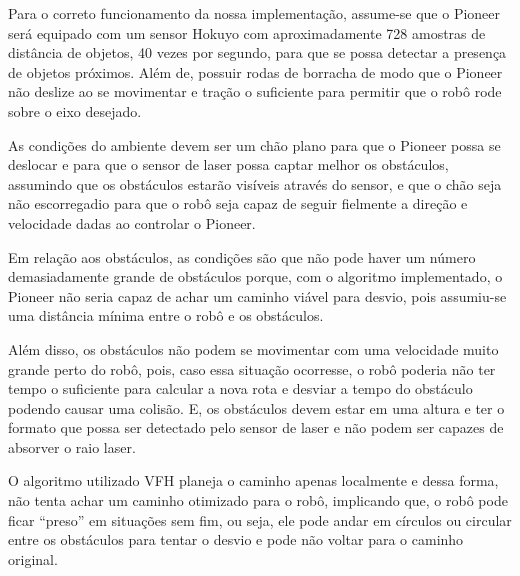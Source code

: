 Para o correto funcionamento da nossa implementação, assume-se que o Pioneer será equipado com um sensor Hokuyo com aproximadamente 728 amostras de distância de objetos, 40 vezes por segundo, para que se possa detectar a presença de objetos próximos. Além de, possuir rodas de borracha de modo que o Pioneer não deslize ao se movimentar e tração o suficiente para permitir que o robô rode sobre o eixo desejado.

As condições do ambiente devem ser um chão plano para que o Pioneer possa se deslocar e para que o sensor de laser possa captar melhor os obstáculos, assumindo que os obstáculos estarão visíveis através do sensor, e que o chão seja não escorregadio para que o robô seja capaz de seguir fielmente a direção e velocidade dadas ao controlar o Pioneer.

Em relação aos obstáculos, as condições são que não pode haver um número demasiadamente grande de obstáculos porque, com o algoritmo implementado, o Pioneer não seria capaz de achar um caminho viável para desvio, pois assumiu-se uma distância mínima entre o robô e os obstáculos. 

Além disso, os obstáculos não podem se movimentar com uma velocidade muito grande perto do robô, pois, caso essa situação ocorresse, o robô poderia não ter tempo o suficiente para calcular a nova rota e desviar a tempo do obstáculo podendo causar uma colisão. E, os obstáculos devem estar em uma altura e ter o formato que possa ser detectado pelo sensor de laser e não podem ser capazes de absorver o raio laser.

O algoritmo utilizado VFH planeja o caminho apenas localmente e dessa forma, não tenta achar um caminho otimizado para o robô, implicando que, o robô pode ficar “preso” em situações sem fim, ou seja, ele pode andar em círculos ou circular entre os obstáculos para tentar o desvio e pode não voltar para o caminho original.
